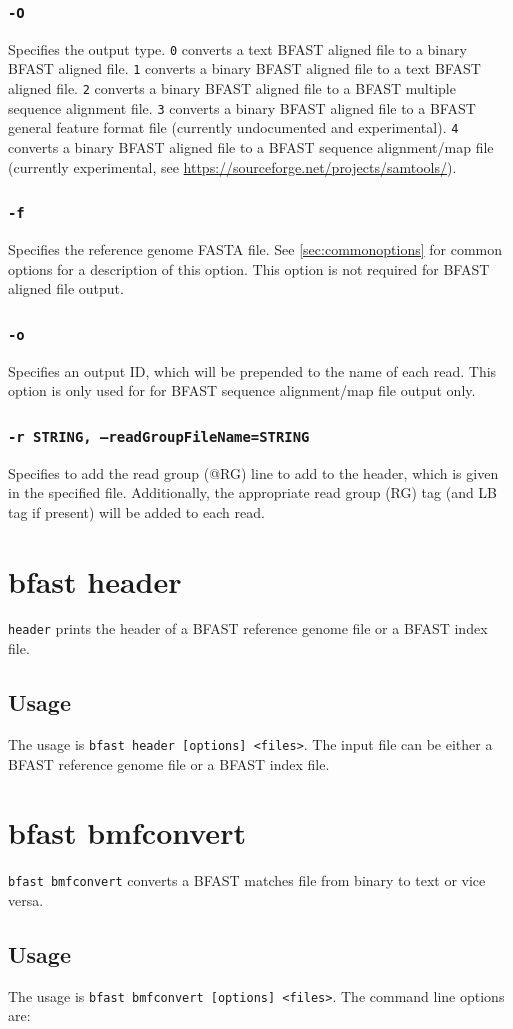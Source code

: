 \documentclass[a4paper,12pt]{book}
\newcommand{\TT}[1]{{\tt #1}} %
\newcommand{\rGFF}{reference genome FASTA file}
\newcommand{\BRGF}{BFAST reference genome file} %
\newcommand{\BIF}{BFAST index file} %
\newcommand{\BMF}{BFAST matches file} %
\newcommand{\BAF}{BFAST aligned file} %
\newcommand{\BMAF}{BFAST multiple sequence alignment file} %
\newcommand{\BGFFF}{BFAST general feature format file} %
\newcommand{\BSAMF}{BFAST sequence alignment/map file} %
\begin{document}
\subsubsection{\TT{-O}}
Specifies the output type.
\TT{0} converts a text \BAF{} to a binary \BAF{}.
\TT{1} converts a binary \BAF{} to a text \BAF{}.
\TT{2} converts a binary \BAF{} to a \BMAF{}.
\TT{3} converts a binary \BAF{} to a \BGFFF{} (currently undocumented and experimental).
\TT{4} converts a binary \BAF{} to a \BSAMF{} (currently experimental, see \url{https://sourceforge.net/projects/samtools/}).
\subsubsection{\TT{-f}}
Specifies the \rGFF{}.
See \autoref{sec:commonoptions} for common options for a description of this option.
This option is not required for \BAF{} output.
\subsubsection{\TT{-o}}
Specifies an output ID, which will be prepended to the name of each read.
This option is only used for for \BSAMF{} output only.

\subsubsection{\TT{-r STRING, --readGroupFileName=STRING}}
Specifies to add the read group (@RG) line to add to the header, which is given in the specified file.
Additionally, the appropriate read group (RG) tag (and LB tag if present) will be added to each read.
\section{bfast header}
\label{sec:header}
\TT{header} prints the header of a \BRGF{} or a \BIF{}.
\subsection{Usage}
The usage is \TT{bfast header [options] <files>}.
The input file can be either a \BRGF{} or a \BIF{}.

\section{bfast bmfconvert}
\label{sec:bmfconvert}
\TT{bfast bmfconvert} converts a \BMF{} from binary to text or vice versa.
\subsection{Usage}
The usage is \TT{bfast bmfconvert [options] <files>}.
The command line options are:
\end{document}
